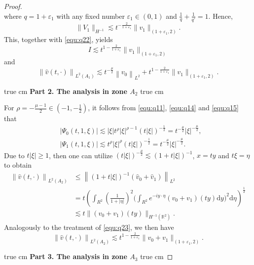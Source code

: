 \documentclass[11pt,twoside]{article}
\newcommand{\R}{\mathbb R}
\newcommand{\f}{\frac}
\theoremstyle{plain}
\theoremstyle{definition}
\theoremstyle{remark}
\numberwithin{equation}{section}
\begin{document}
\begin{proof}
\begin{equation}
\end{equation}
where $q=1+\varepsilon_1$ with any fixed number $\varepsilon_1\in(0,1)$ and $\f{1}{q}+\f{1}{q'}=1$. Hence,
$$
\|V_1\|_{H^{-1}}\lesssim t^{-\f{2}{1+\varepsilon_1}}\|v_1\|_{(1+\varepsilon_1, 2)}.
$$
This, together with \eqref{equ:q22}, yields
$$
I\lesssim t^{1-\f{2}{1+\varepsilon_1}}\|v_1\|_{(1+\varepsilon_1, 2)}
$$
and
\begin{equation}\label{equ:q29}
\left\|\hat{v}(t, \cdot)\right\|_{L^2(A_1)}\lesssim t^{-\frac{\mu}{2}}\left\|v_{0}\right\|_{L^{2}}+ t^{1-\f{2}{1+\varepsilon_1}}\|v_1\|_{(1+\varepsilon_1, 2)}.
\end{equation}

 true cm
{\bf Part 2. The analysis in zone $A_2$}
 true cm

For $\rho=-\f{\mu-1}{2}\in(-1,-\f{1}{2})$, it follows from \eqref{equ:q11}, \eqref{equ:q14} and \eqref{equ:q15} that
\begin{equation}\label{equ:q28}
\begin{aligned}
& \left|\Psi_0(t, 1,\xi)\right| \lesssim|\xi| t^\rho|\xi|^{\rho-1}(t|\xi|)^{-\frac{1}{2}}=t^{-\frac{\mu}{2}}|\xi|^{-\frac{\mu}{2}} ,\\
& \left|\Psi_1(t, 1, \xi)\right|  \lesssim t^\rho|\xi|^{\rho}(t|\xi|)^{-\frac{1}{2}}=t^{-\frac{\mu}{2}}|\xi|^{-\frac{\mu}{2}}.
\end{aligned}
\end{equation}
Due to $t|\xi|\geq 1$, then one can utilize
$(t|\xi|)^{-\f{\mu}{2}}\lesssim (1+t|\xi|)^{-1}$,
$x=ty$ and $t\xi=\eta$ to obtain
\begin{equation}\label{equ:q25}
\begin{aligned}
\left\|\hat{v}(t, \cdot)\right\|_{L^2(A_2)} & \leq\left\|(1+t|\xi|)^{-1}(\hat{v}_{0}+\hat{v}_{1})\right\|_{L^{2}} \\
& =t\left(\int_{R^2} (\frac{1}{1+|\eta|})^2\big(\int_{R^2} e^{-i y \cdot \eta} (v_0+v_1)(ty) \mathrm{d} y\big)^2 \mathrm{d} \eta\right)^{\frac{1}{2}}\\
& \lesssim t\|(v_0+v_1)(ty)\|_{H^{-1}(\R^2)}.
\end{aligned}
\end{equation}
Analogously to the treatment of \eqref{equ:q23}, we then have
\begin{equation}\label{equ:q30}
\left\|\hat{v}(t, \cdot)\right\|_{L^2(A_2)}\lesssim t^{1-\f{2}{1+\varepsilon_1}}\|v_0+v_1\|_{(1+\varepsilon_1, 2)}.
\end{equation}

 true cm
{\bf Part 3. The analysis in zone $A_3$}
 true cm


\end{proof}
\end{document}
